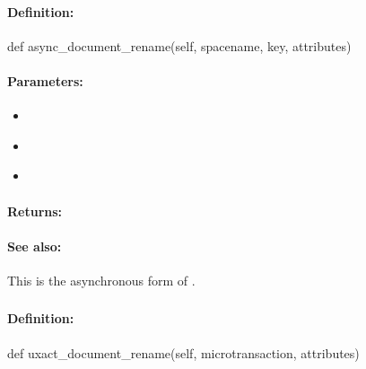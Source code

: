 \paragraph{Definition:}
\begin{pythoncode}
def async_document_rename(self, spacename, key, attributes)
\end{pythoncode}

\paragraph{Parameters:}
\begin{itemize}[noitemsep]
\item {}\\

\item {}\\

\item {}\\

\end{itemize}

\paragraph{Returns:}


\paragraph{See also:}  This is the asynchronous form of .

\pagebreak
\subsubsection{}
\label{api:python:uxact_document_rename}


\paragraph{Definition:}
\begin{pythoncode}
def uxact_document_rename(self, microtransaction, attributes)
\end{pythoncode}

